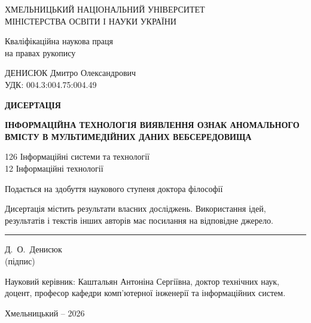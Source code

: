 \begin{titlepage}
\begin{center}
ХМЕЛЬНИЦЬКИЙ НАЦІОНАЛЬНИЙ УНІВЕРСИТЕТ\\
МІНІСТЕРСТВА ОСВІТИ І НАУКИ УКРАЇНИ
\end{center}

\vspace{12mm}
\begin{flushright}
Кваліфікаційна наукова праця\\
на правах рукопису
\end{flushright}

\vspace{6mm}
\begin{flushleft}
ДЕНИСЮК Дмитро Олександрович\\
УДК: 004.3:004.75:004.49
\end{flushleft}

\vfill
\begin{center}
{\bfseries ДИСЕРТАЦІЯ}

\vspace{8mm}
{\bfseries ІНФОРМАЦІЙНА ТЕХНОЛОГІЯ ВИЯВЛЕННЯ ОЗНАК АНОМАЛЬНОГО ВМІСТУ В МУЛЬТИМЕДІЙНИХ ДАНИХ ВЕБСЕРЕДОВИЩА}

\vspace{8mm}
126 Інформаційні системи та технології\\
12 Інформаційні технології

\vspace{8mm}
Подається на здобуття наукового ступеня доктора філософії
\end{center}

\vfill
\noindent Дисертація містить результати власних досліджень. Використання ідей, результатів і текстів інших авторів має посилання на відповідне джерело.

\vspace{6mm}
\begin{flushright}
\rule{35mm}{0.4pt}\hspace{10mm}Д.~О.~Денисюк\\[-1mm]
{\small (підпис)}\hspace{38mm}
\end{flushright}

\vspace{6mm}
\noindent Науковий керівник: Каштальян Антоніна Сергіївна, доктор технічних наук, доцент, професор кафедри комп’ютерної інженерії та інформаційних систем.

\vfill
\begin{center}
Хмельницький -- 2026
\end{center}
\end{titlepage}
